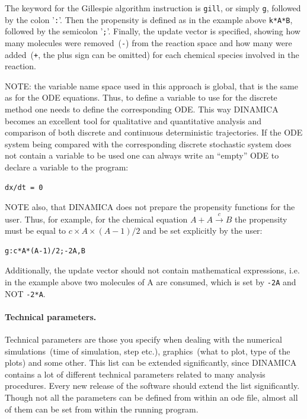 \documentclass[11pt,a4paper]{article}
\begin{document}
The keyword for the Gillespie algorithm instruction is \verb-gill-, or simply
\verb-g-, followed by the colon '\texttt{:}'. Then the propensity is defined as
in the example above \verb-k*A*B-, followed by the semicolon '\texttt{;}'. Finally,
the update vector is specified, showing how many molecules were removed~(\verb'-')
from the reaction space and how many were added~(\verb-+-, the plus sign can be
omitted) for each chemical species involved in the reaction.

NOTE: the variable name space used in this approach is global, that is the same as
for the ODE equations. Thus, to define a variable to use for the discrete method one
needs to define the corresponding ODE. This way DINAMICA becomes an excellent tool
for qualitative and quantitative analysis and comparison of both discrete and
continuous deterministic trajectories. If the ODE system being compared with the
corresponding discrete stochastic system does not contain a variable to be used one
can always write an ``empty'' ODE to declare a variable to the program:
\begin{verbatim}
dx/dt = 0
\end{verbatim}

NOTE also, that DINAMICA does not prepare the propensity functions for the
user. Thus, for example, for the chemical equation $A + A \xrightarrow{c} B$ the
propensity must be equal to $c\times A\times(A-1)/2$ and be set explicitly by the user:
\begin{verbatim}
g:c*A*(A-1)/2;-2A,B
\end{verbatim}

Additionally, the update vector should not contain mathematical expressions, i.e. in
the example above two molecules of A are consumed, which is set by \verb'-2A' and NOT
\verb'-2*A'.

\paragraph{Technical parameters.}
\label{sec:techn-param}

Technical parameters are those you specify when dealing with the numerical
simulations~(time of simulation, step etc.), graphics~(what to plot, type of the
plots) and some other. This list can be extended significantly, since DINAMICA
contains a lot of different technical parameters related to many analysis
procedures. Every new release of the software should extend the list
significantly. Though not all the parameters can be defined from within an ode file,
almost all of them can be set from within the running program.
\end{document}
